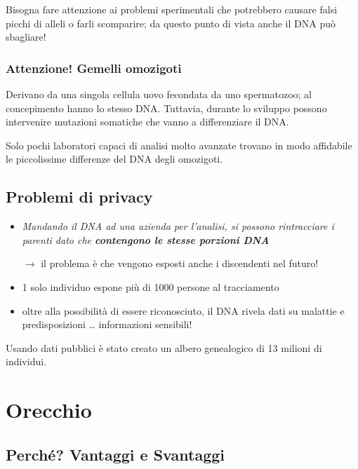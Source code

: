\documentclass{report}
\begin{document}
\noindent Bisogna fare attenzione ai problemi sperimentali 
che potrebbero causare falsi picchi di alleli o farli scomparire;
da questo punto di vista anche il DNA può sbagliare!

\subsection{Attenzione! Gemelli omozigoti}
Derivano da una singola cellula uovo fecondata da uno spermatozoo;
al concepimento hanno lo stesso DNA. Tuttavia, durante lo sviluppo possono intervenire mutazioni
somatiche che vanno a differenziare il DNA.

\noindent Solo pochi laboratori capaci di analisi molto avanzate
trovano in modo affidabile le piccolissime differenze
del DNA degli omozigoti.

\newpage
\section{Problemi di privacy}
\begin{itemize}
    \item \textit{Mandando il DNA ad una azienda per l'analisi, si possono rintracciare i parenti 
    dato che \textbf{contengono le stesse porzioni DNA}}

    $\rightarrow$ il problema è che vengono esposti anche i discendenti nel futuro! 
    \item 1 solo individuo espone più di 1000 persone al tracciamento
    \item oltre alla possibilità di essere riconosciuto, il DNA rivela dati su malattie e predisposizioni \dots
    informazioni sensibili!
\end{itemize}

\noindent Usando dati pubblici è stato creato un albero genealogico di 13 milioni di individui.


\chapter{Orecchio}

\section{Perché? Vantaggi e Svantaggi}
\end{document}
